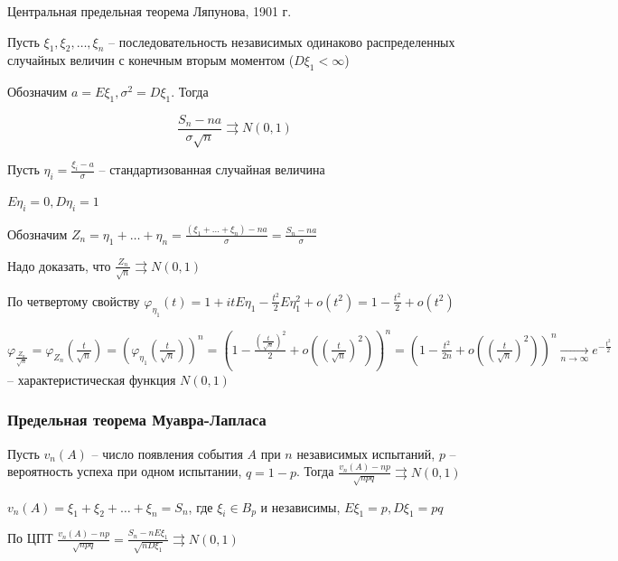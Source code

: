 \begin{MyTheorem}
    \Ths Центральная предельная теорема Ляпунова, 1901 г.

    Пусть $\xi_1, \xi_2, \dots, \xi_n$ -- последовательность независимых одинаково распределенных случайных величин с конечным вторым моментом ($D\xi_1 < \infty$)

    Обозначим $a = E\xi_1, \sigma^2 = D\xi_1$. Тогда 

    \[\frac{S_n - na}{\sigma\sqrt{n}} \rightrightarrows N(0, 1)\]
\end{MyTheorem}

\begin{MyProof}
    Пусть $\eta_i = \frac{\xi_i - a}{\sigma}$ -- стандартизованная случайная величина

    $E\eta_i = 0, D\eta_i = 1$

    Обозначим $Z_n = \eta_1 + \dots + \eta_n = \frac{(\xi_1 + \dots + \xi_n) - na}{\sigma} = \frac{S_n - na}{\sigma}$

    Надо доказать, что $\frac{Z_n}{\sqrt{n}} \rightrightarrows N(0, 1)$

    По четвертому свойству $\varphi_{\eta_1}(t) = 1 + itE\eta_1 - \frac{t^2}{2} E\eta_1^2 + o(t^2) = 1 - \frac{t^2}{2} + o(t^2)$

    $\varphi_{\frac{Z_n}{\sqrt{n}}} = \varphi_{Z_n}\left(\frac{t}{\sqrt{n}}\right) = \left(\varphi_{\eta_1}\left(\frac{t}{\sqrt{n}}\right)\right)^n = 
    \left(1 - \frac{\left(\frac{t}{\sqrt{n}}\right)^2}{2} + o\left(\left(\frac{t}{\sqrt{n}}\right)^2\right)\right)^n =
    \left(1 - \frac{t^2}{2n} + o\left(\left(\frac{t}{\sqrt{n}}\right)^2\right)\right)^n \underset{n \to \infty}{\longrightarrow} e^{-\frac{t^2}{2}}$ -- 
    характеристическая функция $N(0, 1)$
\end{MyProof}

\hypertarget{limittheoremdemoivrelaplace}{}

\subsubsection{Предельная теорема Муавра-Лапласа}

\begin{MyTheorem}
    \Ths Пусть $v_n(A)$ -- число появления события $A$ при $n$ независимых испытаний, $p$ -- вероятность успеха при одном испытании, $q = 1 - p$.
    Тогда $\frac{v_n(A) - np}{\sqrt{npq}} \rightrightarrows N(0, 1)$
\end{MyTheorem}

\begin{MyProof}
    $v_n(A) = \xi_1 + \xi_2 + \dots + \xi_n = S_n$, где $\xi_i \in B_p$ и независимы, $E\xi_1 = p, D\xi_1 = pq$

    По ЦПТ $\frac{v_n(A) - np}{\sqrt{npq}} = \frac{S_n - nE\xi_1}{\sqrt{nD\xi_1}} \rightrightarrows N(0, 1)$
\end{MyProof}

